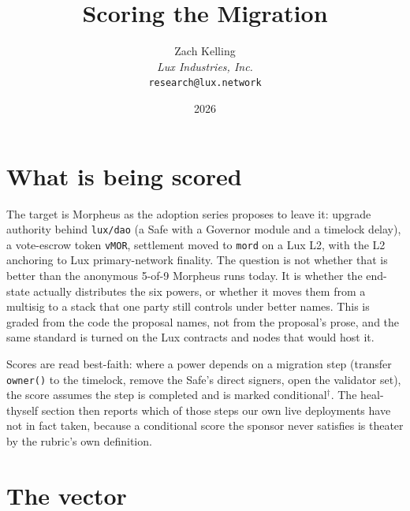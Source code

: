 \documentclass[11pt,a4paper]{article}
\title{Scoring the Migration}
\author{Zach Kelling\\\textit{Lux Industries, Inc.}\\\texttt{research@lux.network}}
\date{2026}
\newcommand{\code}[1]{\texttt{\small #1}}
\newcommand{\cond}{$^{\dagger}$}
\begin{document}
\luxcoverpage
\sloppy

\par
\vspace{0.8ex}
\par
\vspace{0.4ex}
\par
\vspace{0.7ex}
\noindent{\color{rule}\rule{\linewidth}{1.1pt}}\par
\vspace{1.0ex}

\section{What is being scored}

The target is Morpheus as the adoption series proposes to leave it: upgrade
authority behind \code{lux/dao} (a Safe with a Governor module and a timelock
delay), a vote-escrow token \code{vMOR}, settlement moved to \code{mord} on a Lux
L2, with the L2 anchoring to Lux primary-network finality. The question is not
whether that is better than the anonymous 5-of-9 Morpheus runs today. It is
whether the end-state actually distributes the six powers, or whether it moves
them from a multisig to a stack that one party still controls under better names.
This is graded from the code the proposal names, not from the proposal's prose,
and the same standard is turned on the Lux contracts and nodes that would host it.

Scores are read best-faith: where a power depends on a migration step (transfer
\code{owner()} to the timelock, remove the Safe's direct signers, open the
validator set), the score assumes the step is completed and is marked
conditional\cond. The heal-thyself section then reports which of those steps our
own live deployments have not in fact taken, because a conditional score the
sponsor never satisfies is theater by the rubric's own definition.

\section{The vector}
\end{document}
